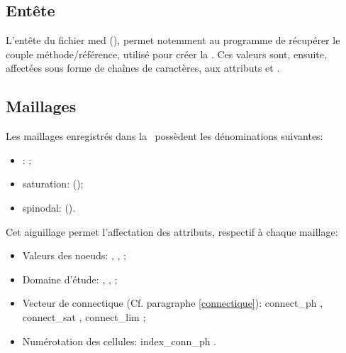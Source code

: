     \subsection{Entête}
    L'entête du fichier med (), permet notemment au 
    programme de récupérer le couple méthode/référence, utilisé pour créer la \bdd.
    Ces valeurs sont, ensuite, affectées sous forme de chaînes de caractères, aux attributs  et .
    
    \subsection{Maillages}\label{maillages}
    Les maillages enregistrés dans la \bdd\ possèdent les dénominations suivantes:
    \vspace{0.3cm}
    \begin{itemize}
      \item[\ding{192}] \pph: ;
      \item[\ding{193}] saturation:  (\sgp);
      \item[\ding{194}] spinodal:  (\sgp).
    \end{itemize}
    \vspace{0.5cm}
    
    Cet aiguillage permet l'affectation des attributs, respectif à chaque maillage:
    \vspace{0.3cm}
    \begin{itemize}
      \item Valeurs des noeuds:  ,  ,  ;
      \item Domaine d'étude:  ,  ,  ;
      \item Vecteur de connectique (Cf. paragraphe \ref{connectique}):
      connect\_ph , connect\_sat , connect\_lim ;
      \item Numérotation des cellules: index\_conn\_ph .
    \end{itemize}
    \vspace{0.5cm}
    
